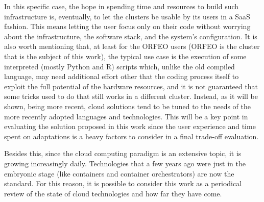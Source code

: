 In this specific case, the hope in spending time and resources to build such
infrastructure is, eventually, to let the clusters be usable by its users in
a SaaS fashion. This means letting the user focus only on their code without
worrying about the infrastructure, the software stack, and the system's
configuration.
It is also worth mentioning that, at least for the ORFEO users (ORFEO is the
cluster that is the subject of this work), the typical use case is the execution
of some interpreted (mostly Python and R) scripts which, unlike the old compiled
language, may need additional effort other that the coding process itself to
exploit the full potential of the hardware resources, and it is not guaranteed
that some tricks used to do that still works in a different cluster.
Instead, as it will be shown, being more recent, cloud solutions tend to be
tuned to the needs of the more recently adopted languages and technologies.
This will be a key point in evaluating the solution proposed in this work since
the user experience and time spent on adaptations is a heavy factors to consider
in a final trade-off evaluation.

Besides this, since the cloud computing paradigm is an extensive topic, it is
growing increasingly daily. Technologies that a few years ago were just in
the embryonic stage (like containers and container orchestrators) are now the
standard. For this reason, it is possible to consider this work as a periodical
review of the state of cloud technologies and how far they have come.









